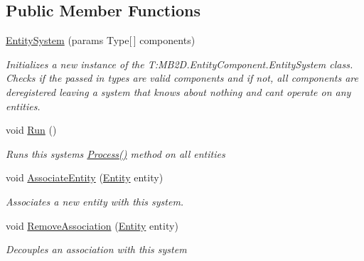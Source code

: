 \subsection*{Public Member Functions}
\begin{DoxyCompactItemize}
\item 
\hyperlink{class_m_b2_d_1_1_entity_component_1_1_entity_system_abc7175246313b23db881d09da586428a}{Entity\+System} (params Type\mbox{[}$\,$\mbox{]} components)
\begin{DoxyCompactList}\small\item\em Initializes a new instance of the T\+:\+M\+B2\+D.\+Entity\+Component.\+Entity\+System class. Checks if the passed in types are valid components and if not, all components are deregistered leaving a system that knows about nothing and can\textquotesingle{}t operate on any entities. \end{DoxyCompactList}\item 
void \hyperlink{class_m_b2_d_1_1_entity_component_1_1_entity_system_a3a1a74c4d3f8f0f452e0cdaa5515face}{Run} ()
\begin{DoxyCompactList}\small\item\em Runs this systems \hyperlink{class_m_b2_d_1_1_entity_component_1_1_entity_system_abbf83b87cb5d12754fb058cef50451fa}{Process()} method on all entities \end{DoxyCompactList}\item 
void \hyperlink{class_m_b2_d_1_1_entity_component_1_1_entity_system_aaf18ceb985015ddbff4a361a3b1de5bb}{Associate\+Entity} (\hyperlink{class_m_b2_d_1_1_entity_component_1_1_entity}{Entity} entity)
\begin{DoxyCompactList}\small\item\em Associates a new entity with this system. \end{DoxyCompactList}\item 
void \hyperlink{class_m_b2_d_1_1_entity_component_1_1_entity_system_a6fa9406e1f4a0ca8ddf21cf04be3abe3}{Remove\+Association} (\hyperlink{class_m_b2_d_1_1_entity_component_1_1_entity}{Entity} entity)
\begin{DoxyCompactList}\small\item\em Decouples an association with this system \end{DoxyCompactList}\end{DoxyCompactItemize}
